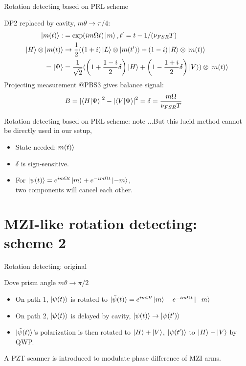 \documentclass[amssymb, amsmath]{beamer}
\begin{document}
\begin{frame}{Rotation detecting based on PRL scheme}

DP2 replaced by cavity, $m\theta\to\pi/4$:
\begin{align}
    \ket{m(t)} :&= \exp(i m\Omega t)\ket{m}, t^\prime = t-1/(\nu_{FSR}T) \\ 
    \ket{H}\otimes\ket{m(t)} &\to \frac{1}{2}((1+i)\ket{L}\otimes\ket{m(t^\prime)} + (1-i)\ket{R}\otimes\ket{m(t)} \nonumber \\ 
    = \ket{\Psi} &= \frac{1}{\sqrt{2}}(\left(1+\frac{1-i}{2}\delta\right)\ket{H}+\left(1-\frac{1+i}{2}\delta\right)\ket{V})\otimes\ket{m(t)}
\end{align}
Projecting measurement @PBS3 gives balance signal:
\begin{align}
    B &= \left|\braket{H|\Psi}\right|^2 - \left|\braket{V|\Psi}\right|^2 = \delta = \frac{m \Omega}{\nu_{FSR}T}
\end{align}
    
\end{frame}

\begin{frame}{Rotation detecting based on PRL scheme: note}
...But this lucid method cannot be directly used in our setup,
\begin{itemize}
    \item State needed:$\ket{m(t)}$
    \item $\delta$ is sign-sensitive.
    \item For $\ket{\psi(t)}=e^{i m\Omega t}\ket{m}+e^{-i m\Omega t}\ket{-m}$, \\
    \hspace{10pt} two components will \textcolor{suoh}{cancel each other.}
\end{itemize}
    
\end{frame}

\section{MZI-like rotation detecting: scheme 2}

\begin{frame}{Rotation detecting: original}

Dove prism angle $m\theta\to\pi/2$
\begin{itemize}
    \item On path 1, $\ket{\psi(t)}$ is rotated to $\ket{\tilde{\psi}(t)}=e^{i m\Omega t}\ket{m}-e^{-i m\Omega t}\ket{-m}$
    \item On path 2, $\ket{\psi(t)}$ is delayed by cavity, $\ket{\psi(t)}\to\ket{\psi(t^\prime)}$ 
    \item $\ket{\tilde{\psi}(t)}$'s polarization is then rotated to $\ket{H}+\ket{V}$, $\ket{\psi(t^\prime)}$ to $\ket{H}-\ket{V}$ by QWP.
\end{itemize}


A PZT scanner is introduced to modulate phase difference of MZI arms.    

\end{frame}
\end{document}

